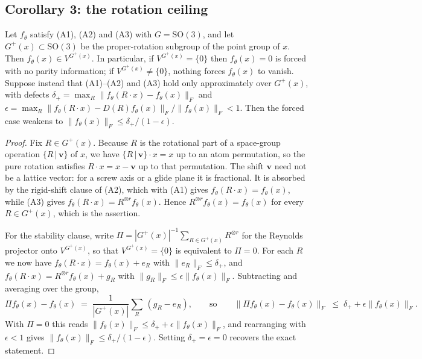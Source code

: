 \subsection*{Corollary 3: the rotation ceiling}

\begin{corollary}\label{scor:rot}
Let $f_\theta$ satisfy (A1), (A2) and (A3) with $G = \mathrm{SO}(3)$, and let $G^{+}(x) \subset \mathrm{SO}(3)$ be the proper-rotation subgroup of the point group of $x$. Then $f_\theta(x) \in V^{G^{+}(x)}$. In particular, if $V^{G^{+}(x)} = \{0\}$ then $f_\theta(x) = 0$ is forced with no parity information; if $V^{G^{+}(x)} \neq \{0\}$, nothing forces $f_\theta(x)$ to vanish. Suppose instead that (A1)--(A2) and (A3) hold only approximately over $G^{+}(x)$, with defects $\delta_{+} = \max_{R} \lVert f_\theta(R\!\cdot\!x) - f_\theta(x)\rVert_F$ and $\epsilon = \max_{R} \lVert f_\theta(R\!\cdot\!x) - D(R)f_\theta(x)\rVert_F / \lVert f_\theta(x)\rVert_F < 1$. Then the forced case weakens to $\lVert f_\theta(x)\rVert_F \le \delta_{+}/(1-\epsilon)$.
\end{corollary}

\begin{proof}
Fix $R \in G^{+}(x)$. Because $R$ is the rotational part of a space-group operation $\{R \,|\, \mathbf{v}\}$ of $x$, we have $\{R \,|\, \mathbf{v}\}\!\cdot\!x = x$ up to an atom permutation, so the pure rotation satisfies $R\!\cdot\!x = x - \mathbf{v}$ up to that permutation. The shift $\mathbf{v}$ need not be a lattice vector: for a screw axis or a glide plane it is fractional. It is absorbed by the rigid-shift clause of (A2), which with (A1) gives $f_\theta(R\!\cdot\!x) = f_\theta(x)$, while (A3) gives $f_\theta(R\!\cdot\!x) = R^{\otimes r} f_\theta(x)$. Hence $R^{\otimes r} f_\theta(x) = f_\theta(x)$ for every $R \in G^{+}(x)$, which is the assertion.

For the stability clause, write $\Pi = |G^{+}(x)|^{-1}\sum_{R \in G^{+}(x)} R^{\otimes r}$ for the Reynolds projector onto $V^{G^{+}(x)}$, so that $V^{G^{+}(x)} = \{0\}$ is equivalent to $\Pi = 0$. For each $R$ we now have $f_\theta(R\!\cdot\!x) = f_\theta(x) + e_R$ with $\lVert e_R\rVert_F \le \delta_{+}$, and $f_\theta(R\!\cdot\!x) = R^{\otimes r}f_\theta(x) + g_R$ with $\lVert g_R\rVert_F \le \epsilon\lVert f_\theta(x)\rVert_F$. Subtracting and averaging over the group,
\[
\Pi f_\theta(x) - f_\theta(x) \;=\; \frac{1}{|G^{+}(x)|}\sum_{R}\,(g_R - e_R),
\qquad\text{so}\qquad
\lVert \Pi f_\theta(x) - f_\theta(x)\rVert_F \;\le\; \delta_{+} + \epsilon\lVert f_\theta(x)\rVert_F .
\]
With $\Pi = 0$ this reads $\lVert f_\theta(x)\rVert_F \le \delta_{+} + \epsilon \lVert f_\theta(x)\rVert_F$, and rearranging with $\epsilon<1$ gives $\lVert f_\theta(x)\rVert_F \le \delta_{+}/(1-\epsilon)$. Setting $\delta_{+} = \epsilon = 0$ recovers the exact statement.
\end{proof}

